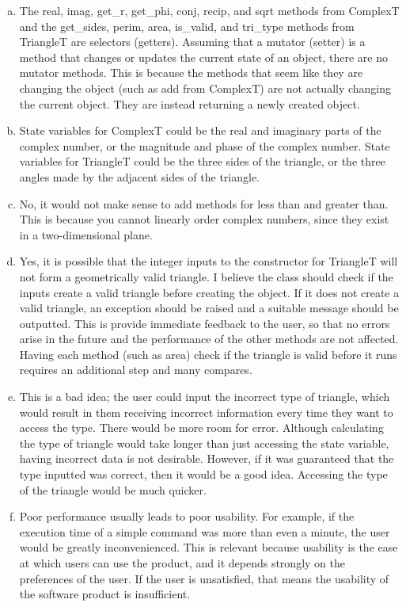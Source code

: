 \documentclass[12pt]{article}
\begin{document}
\begin{enumerate}[(a)]

\item The real, imag, get\_r, get\_phi, conj, recip, and sqrt methods from ComplexT and the get\_sides, perim, area, is\_valid, and tri\_type methods from TriangleT are selectors (getters). Assuming that a mutator (setter) is a method that changes or updates the current state of an object, there are no mutator methods. This is because the methods that seem like they are changing the object (such as add from ComplexT) are not actually changing the current object. They are instead returning a newly created object.
\item State variables for ComplexT could be the real and imaginary parts of the complex number, or the magnitude and phase of the complex number. State variables for TriangleT could be the three sides of the triangle, or the three angles made by the adjacent sides of the triangle.
\item No, it would not make sense to add methods for less than and greater than. This is because you cannot linearly order complex numbers, since they exist in a two-dimensional plane.
\item Yes, it is possible that the integer inputs to the constructor for TriangleT will not form a geometrically valid triangle. I believe the class should check if the inputs create a valid triangle before creating the object. If it does not create a valid triangle, an exception should be raised and a suitable message should be outputted. This is provide immediate feedback to the user, so that no errors arise in the future and the performance of the other methods are not affected. Having each method (such as area) check if the triangle is valid before it runs requires an additional step and many compares. 
\item This is a bad idea; the user could input the incorrect type of triangle, which would result in them receiving incorrect information every time they want to access the type. There would be more room for error. Although calculating the type of triangle would take longer than just accessing the state variable, having incorrect data is not desirable. However, if it was guaranteed that the type inputted was correct, then it would be a good idea. Accessing the type of the triangle would be much quicker.
\item Poor performance usually leads to poor usability. For example, if the execution time of a simple command was more than even a minute, the user would be greatly inconvenienced. This is relevant because usability is the ease at which users can use the product, and it depends strongly on the preferences of the user. If the user is unsatisfied, that means the usability of the software product is insufficient.

\end{enumerate}
\end{document}
